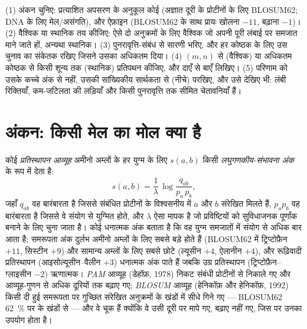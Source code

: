 \begin{method}[दो अनुक्रमों को संरेखित करना]\label{met:b3:bioinformatics:align}
(1) अंकन चुनिए: प्रत्याशित अपसरण के अनुकूल कोई 
(अज्ञात दूरी के प्रोटीनों के लिए BLOSUM62; DNA के लिए मेल/असंगति), और
ऐफ़ाइन  (BLOSUM62 के साथ प्रायः खोलना $-11$, बढ़ाना $-1$)।
(2) वैश्विक या स्थानिक तय कीजिए: ऐसे दो अनुक्रमों के लिए वैश्विक जो
अपनी पूरी लंबाई पर समजात माने जाते हों, अन्यथा स्थानिक।
(3) पुनरावृत्ति-संबंध से सारणी भरिए, और हर कोष्ठक के लिए उस चुनाव का
संकेतक रखिए जिसने उसका अधिकतम दिया। (4) $(m,n)$ से
(वैश्विक) या अधिकतम कोष्ठक से किसी शून्य तक (स्थानिक) प्रतिपथन कीजिए,
और  दाएँ से बाएँ लिखिए। (5) परिणाम को उसके कच्चे अंक से नहीं,
उसकी सांख्यिकीय सार्थकता से (नीचे) परखिए, और उसे देखिए भी: लंबी
रिक्तियाँ, कम-जटिलता की लड़ियाँ और किसी पुनरावृत्ति तक सीमित 
चेतावनियाँ हैं।
\end{method}

\section{अंकन: किसी मेल का मोल क्या है}

\begin{definition}[प्रतिस्थापन आव्यूह]\label{def:b3:bioinformatics:matrices}
कोई \emph{प्रतिस्थापन आव्यूह} अमीनो अम्लों के हर युग्म के लिए $s(a,b)$
किसी \emph{लघुगणकीय-संभावना अंक} के रूप में देता है:
\[
s(a,b) = \frac{1}{\lambda}\,\log\frac{q_{ab}}{p_{a}\,p_{b}},
\]
जहाँ $q_{ab}$ वह बारंबारता है जिससे संबंधित प्रोटीनों के विश्वसनीय
 में $a$ और $b$ संरेखित मिलते हैं, $p_{a} p_{b}$ वह बारंबारता
है जिससे वे संयोग से युग्मित होते, और $\lambda$ ऐसा मापक है जो
प्रविष्टियों को सुविधाजनक पूर्णांक बनाने के लिए चुना जाता है। कोई धनात्मक
अंक बताता है कि वह युग्म समजातों में संयोग से अधिक बार आता है; समरूपता
अंक दुर्लभ अमीनो अम्लों के लिए सबसे बड़े होते हैं (BLOSUM62 में
ट्रिप्टोफ़ैन $+11$, सिस्टीन $+9$) और सामान्य अम्लों के लिए सबसे छोटे
(ल्यूसीन $+4$, ऐलानीन $+4$), और रूढ़िवादी प्रतिस्थापन (आइसोल्यूसीन--वैलीन $+3$)
धनात्मक अंक पाते हैं जबकि उग्र प्रतिस्थापन (ट्रिप्टोफ़ैन--ग्लाइसीन $-2$)
ऋणात्मक। \emph{PAM} आव्यूह (डेहॉफ़, 1978) निकट संबंधी प्रोटीनों से
निकाले गए और आव्यूह-गुणन से अधिक दूरियों तक बढ़ाए गए;
\emph{BLOSUM} आव्यूह (हेनिकॉफ़ और हेनिकॉफ़, 1992) किसी दी हुई समरूपता पर
गुच्छित संरेखित अनुक्रमों के खंडों में सीधे गिने गए --- BLOSUM62
\qty{62}{\%} पर के खंडों से --- और वे चूक हैं क्योंकि वे उसी दूरी पर
मापे गए, बढ़ाए नहीं गए, जिस पर उनका उपयोग होता है।
\end{definition}

